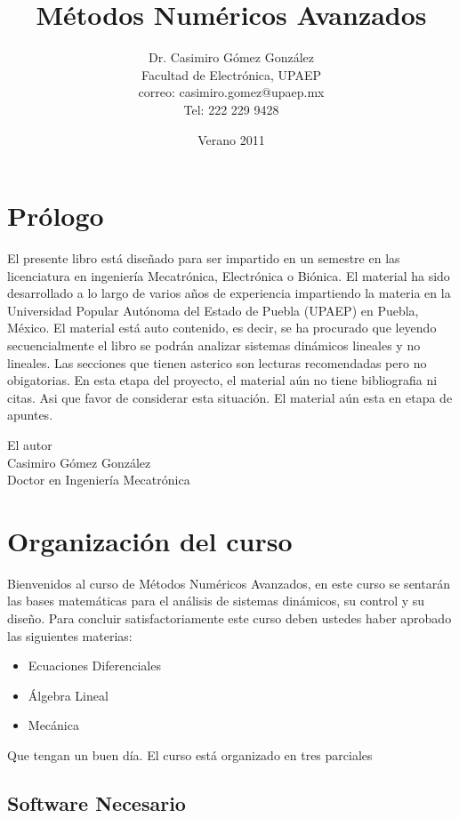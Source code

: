 \documentclass[12pt]{book}
\title{Métodos Numéricos Avanzados}
\author{Dr. Casimiro Gómez González\\
	Facultad de Electrónica, UPAEP\\
               correo: casimiro.gomez@upaep.mx\\
               Tel: 222 229 9428}
\date{Verano 2011}
\theoremstyle{definition}
\theoremstyle{remark}
\theoremstyle{plain}
\begin{document}
\frontmatter
\maketitle


\chapter{Prólogo}

El presente libro está diseñado para ser impartido en un semestre en las licenciatura en ingeniería Mecatrónica, Electrónica o Biónica. 
El material ha sido desarrollado a lo largo de varios años de experiencia impartiendo la materia en la Universidad Popular Autónoma del 
Estado de Puebla (UPAEP) en Puebla, México. El material está auto contenido, es decir, se ha procurado que leyendo secuencialmente el 
libro se podrán analizar sistemas dinámicos lineales y no lineales. Las secciones que tienen asterico son lecturas recomendadas pero no 
obigatorias. En esta etapa del proyecto, el material aún no tiene bibliografia ni citas. Asi que favor de considerar esta situación. El 
material aún esta en etapa de apuntes.


\begin{flushright}

El autor\\
Casimiro Gómez González\\
Doctor en Ingeniería Mecatrónica
\end{flushright}

\tableofcontents

\mainmatter

\chapter{Organización del curso}
Bienvenidos al curso de Métodos Numéricos Avanzados, en este curso se sentarán las bases matemáticas para el análisis de sistemas dinámicos, 
su control y su diseño. Para concluir satisfactoriamente este curso deben ustedes haber aprobado las siguientes materias:
\begin{itemize}
 \item Ecuaciones Diferenciales
 \item Álgebra Lineal
 \item Mecánica
\end{itemize}

Que tengan un buen día. El curso está organizado en tres parciales

\section{Software Necesario}
\end{document}
